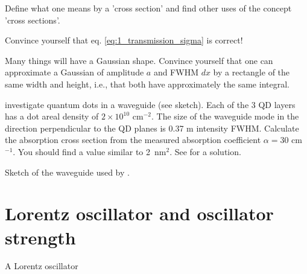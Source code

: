 \begin{questions}
  \item Define what one means by a 'cross section' and find other uses of the concept 'cross sections'.

  \item Convince yourself that eq. \ref{eq:1_transmission_sigma} is correct!
  
  \item Many things will have a Gaussian shape. Convince yourself that one can approximate a Gaussian of amplitude $a$ and FWHM $dx$ by a rectangle of the same width and height, i.e., that both have approximately the same integral.

 \item \cite{Borri:2002p139} investigate  quantum dots in a waveguide (see sketch). Each of the 3 QD layers has a dot areal density of $2 \times 10^{10}$ cm$^{-2}$. The size of the waveguide mode in the direction perpendicular to the QD planes is 0.37 \textmu m intensity FWHM. Calculate the absorption cross section from the measured absorption coefficient $\alpha = 30$ cm$^{-1}$. You should find a value similar to 2~nm$^2$. See  for a solution. \label{qu:2_borri_wg}
\end{questions}
  
\begin{marginfigure}
  \caption{Sketch of the waveguide used by \cite{Borri:2002p139}. }
\end{marginfigure}




\section{Lorentz oscillator and oscillator strength}


\begin{marginfigure}
\caption{A Lorentz oscillator}
\end{marginfigure}


